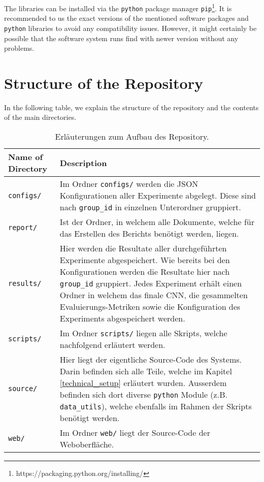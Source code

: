 The libraries can be installed via the \texttt{python} package manager \texttt{pip}\footnote{https://packaging.python.org/installing/}. It is recommended to us the exact versions of the mentioned software packages and \texttt{python} libraries to avoid any compatibility issues. However, it might certainly be possible that the software system runs find with newer version without any problems.

\clearpage
\section{Structure of the Repository}
In the following table, we explain the structure of the repository and the contents of the main directories.

\begin{table}[H]
	\centering
	\begin{tabularx}{\textwidth}{lX}
		\toprule
		Name of Directory & Description\\ \midrule
		\texttt{configs/} & Im Ordner \texttt{configs/} werden die JSON Konfigurationen aller Experimente abgelegt. Diese sind nach \texttt{group{\_}id} in einzelnen Unterordner gruppiert.\\
		\texttt{report/} & Ist der Ordner, in welchem alle Dokumente, welche für das Erstellen des Berichts benötigt werden, liegen.\\
		\texttt{results/} & Hier werden die Resultate aller durchgeführten Experimente abgespeichert. Wie bereits bei den Konfigurationen werden die Resultate hier nach \texttt{group{\_}id} gruppiert. Jedes Experiment erhält einen Ordner in welchem das finale CNN, die gesammelten Evaluierungs-Metriken sowie die Konfiguration des Experiments abgespeichert werden.\\
		\texttt{scripts/} & Im Ordner \texttt{scripts/} liegen alle Skripts, welche nachfolgend erläutert werden.\\
		\texttt{source/} & Hier liegt der eigentliche Source-Code des Systems. Darin befinden sich alle Teile, welche im Kapitel \ref{technical_setup} erläutert wurden. Ausserdem befinden sich dort diverse \texttt{python} Module (z.B. \texttt{data{\_}utils}), welche ebenfalls im Rahmen der Skripts benötigt werden.\\
		\texttt{web/} & Im Ordner \texttt{web/} liegt der Source-Code der Weboberfläche.\\
		\bottomrule
	\end{tabularx}
	\caption{Erläuterungen zum Aufbau des Repository.}
\end{table}


